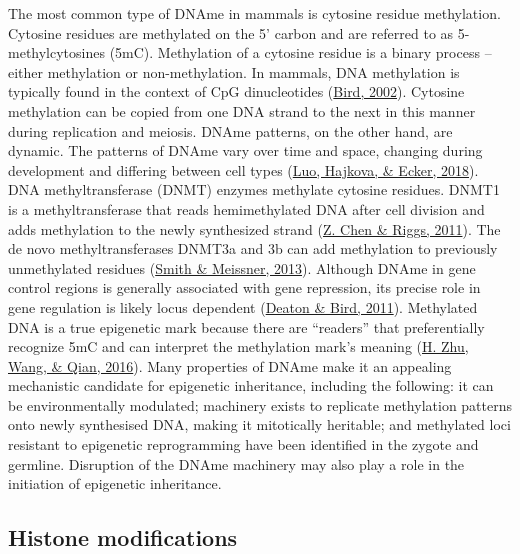 \documentclass[12pt,twoside]{reedthesis}
\begin{document}
The most common type of DNAme in mammals is cytosine residue
methylation. Cytosine residues are methylated on the 5' carbon and are
referred to as 5-methylcytosines (5mC). Methylation of a cytosine
residue is a binary process -- either methylation or non-methylation. In
mammals, DNA methylation is typically found in the context of CpG
dinucleotides (\protect\hyperlink{ref-bird2002}{Bird, 2002}). Cytosine methylation can be copied from one
DNA strand to the next in this manner during replication and meiosis.
DNAme patterns, on the other hand, are dynamic. The patterns of DNAme
vary over time and space, changing during development and differing
between cell types (\protect\hyperlink{ref-luo2018}{Luo, Hajkova, \& Ecker, 2018}). DNA methyltransferase (DNMT) enzymes
methylate cytosine residues. DNMT1 is a methyltransferase that reads
hemimethylated DNA after cell division and adds methylation to the newly
synthesized strand (\protect\hyperlink{ref-chen2011}{Z. Chen \& Riggs, 2011}). The de novo methyltransferases DNMT3a
and 3b can add methylation to previously unmethylated residues
(\protect\hyperlink{ref-smith2013}{Smith \& Meissner, 2013}). Although DNAme in gene control regions is generally
associated with gene repression, its precise role in gene regulation is
likely locus dependent (\protect\hyperlink{ref-deaton2011}{Deaton \& Bird, 2011}). Methylated DNA is a true
epigenetic mark because there are ``readers'' that preferentially
recognize 5mC and can interpret the methylation mark's meaning
(\protect\hyperlink{ref-zhu2016a}{H. Zhu, Wang, \& Qian, 2016}). Many properties of DNAme make it an appealing mechanistic
candidate for epigenetic inheritance, including the following: it can be
environmentally modulated; machinery exists to replicate methylation
patterns onto newly synthesised DNA, making it mitotically heritable;
and methylated loci resistant to epigenetic reprogramming have been
identified in the zygote and germline. Disruption of the DNAme machinery
may also play a role in the initiation of epigenetic inheritance.

\hypertarget{histone-modifications}{%
\subsection*{Histone modifications}\label{histone-modifications}}
\end{document}
